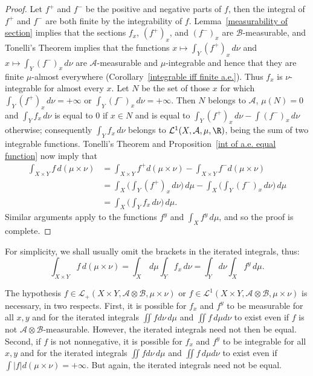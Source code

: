 \begin{proof}
Let $f^+$ and $f^-$ be the positive and negative parts of $f$, then the integral of $f^+$ and $f^-$ are both finite by the integrability of $f$. Lemma~\ref{measurability of section} implies that the sections $f_x$, $(f^+)_x$, and $(f^-)_x$ are $\mathcal{B}$-measurable, and Tonelli's Theorem implies that the functions $x\mapsto\int_Y(f^+)_x\,d\nu$ and $x\mapsto\int_Y(f^-)_x\,d\nu$ are $\mathcal{A}$-measurable and $\mu$-integrable and hence that they are finite $\mu$-almost everywhere (Corollary~\ref{integrable iff finite a.e.}). Thus $f_x$ is $\nu$-integrable for almost every $x$. Let $N$ be the set of those $x$ for which $\int_Y(f^+)_x\,d\nu=+\infty$ or $\int_Y(f^-)_x\,d\nu=+\infty$. Then $N$ belongs to $\mathcal{A}$, $\mu(N)=0$ and $\int_Yf_x\,d\nu$ is equal to $0$ if $x\in N$ and is equal to $\int_Y(f^+)_x\,d\nu-\int(f^-)_x\,d\nu$ otherwise; consequently $\int_Yf_x\,d\nu$ belongs to $\mathcal{L}^1(X,\mathcal{A},\mu,\R)$, being the sum of two integrable functions. Tonelli's Theorem and Proposition~\ref{int of a.e. equal function} now imply that
\begin{align*}
\int_{X\times Y}f\,d(\mu\times\nu)&=\int_{X\times Y}f^+d(\mu\times\nu)-\int_{X\times Y}f^-d(\mu\times\nu)\\
&=\int_{X}\Big(\int_{Y}(f^+)_x\,d\nu\Big)\,d\mu-\int_{X}\Big(\int_{Y}(f^-)_x\,d\nu\Big)\,d\mu\\
&=\int_{X}\Big(\int_Yf_x\,d\nu\Big)\,d\mu.
\end{align*}
Similar arguments apply to the functions $f^y$ and $\int_Xf^y\,d\mu$, and so the proof is complete.
\end{proof}
\begin{remark}
For simplicity, we shall usually omit the brackets in the iterated integrals, thus:
\[\int_{X\times Y}f\,d(\mu\times\nu)=\int_X\,d\mu\int_Yf_x\,d\nu =\int_Yd\nu\int_Xf^y\,d\mu.\]
\end{remark}
\begin{remark}
The hypothesis $f\in\mathcal{L}_+(X\times Y,\mathcal{A}\otimes\mathcal{B},\mu\times\nu)$ or $f\in\mathcal{L}^1(X\times Y,\mathcal{A}\otimes\mathcal{B},\mu\times\nu)$ is necessary, in two respects. First, it is possible for $f_x$ and $f^y$ to be measurable for all $x,y$ and for the iterated integrals $\iint fd\nu\,d\mu$ and $\iint f\,d\mu d\nu$ to exist even if $f$ is not $\mathcal{A}\otimes\mathcal{B}$-measurable. However, the iterated integrals need not then be equal. Second, if $f$ is not nonnegative, it is possible for $f_x$ and $f^y$ to be integrable for all $x,y$ and for the iterated integrals $\iint fd\nu\,d\mu$ and $\iint f\,d\mu d\nu$ to exist even if $\int|f|d(\mu\times\nu)=+\infty$. But again, the iterated integrals need not be equal.
\end{remark}

